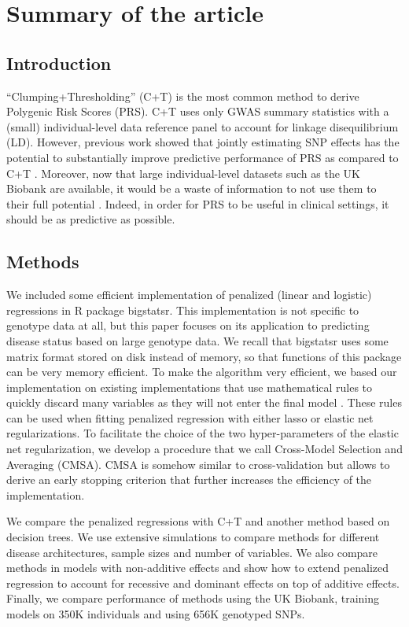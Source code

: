 \section{Summary of the article}

\subsection{Introduction}

``Clumping+Thresholding'' (C+T) is the most common method to derive Polygenic Risk Scores (PRS). C+T uses only GWAS summary statistics with a (small) individual-level data reference panel to account for linkage disequilibrium (LD). 
However, previous work showed that jointly estimating SNP effects has the potential to substantially improve predictive performance of PRS as compared to C+T \cite[]{abraham2013performance}.
Moreover, now that large individual-level datasets such as the UK Biobank are available, it would be a waste of information to not use them to their full potential \cite[]{bycroft2017genome}.
Indeed, in order for PRS to be useful in clinical settings, it should be as predictive as possible.

\subsection{Methods}

We included some efficient implementation of penalized (linear and logistic) regressions in R package bigstatsr. 
This implementation is not specific to genotype data at all, but this paper focuses on its application to predicting disease status based on large genotype data.
We recall that bigstatsr uses some matrix format stored on disk instead of memory, so that functions of this package can be very memory efficient.
To make the algorithm very efficient, we based our implementation on existing implementations that use mathematical rules to quickly discard many variables as they will not enter the final model \cite[]{tibshirani2012strong}.
These rules can be used when fitting penalized regression with either lasso or elastic net regularizations.
To facilitate the choice of the two hyper-parameters of the elastic net regularization, we develop a procedure that we call Cross-Model Selection and Averaging (CMSA).
CMSA is somehow similar to cross-validation but allows to derive an early stopping criterion that further increases the efficiency of the implementation.

We compare the penalized regressions with C+T and another method based on decision trees. We use extensive simulations to compare methods for different disease architectures, sample sizes and number of variables. We also compare methods in models with non-additive effects and show how to extend penalized regression to account for recessive and dominant effects on top of additive effects. Finally, we compare performance of methods using the UK Biobank, training models on 350K individuals and using 656K genotyped SNPs.


